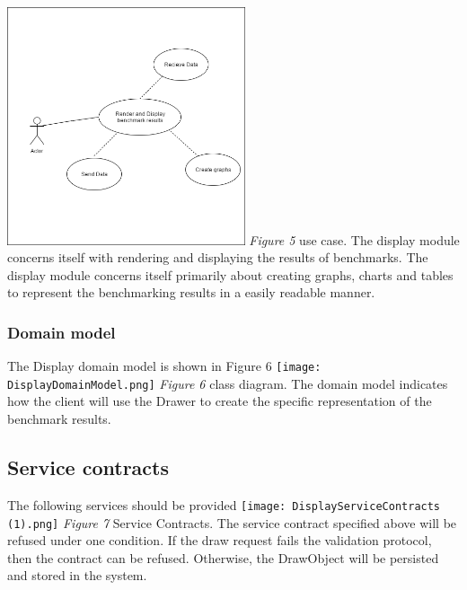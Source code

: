 \documentclass[runningheads,a4paper]{article}
\begin{document}
\includegraphics[width=7cm,height=7cm]{../Images/DisplayUseCase.png}
\newline 
\textit{Figure 5} use case.
\newline
\newline
The display module concerns itself with rendering and displaying the results of benchmarks.
The display module concerns itself primarily about creating graphs, charts and tables to represent the
benchmarking results in a easily readable manner. 
\newline
\subsubsection{\textbf{Domain model}}
The Display domain model is shown in Figure 6
\newline
\newline
\texttt{[image: DisplayDomainModel.png]}
\newline 
\textit{Figure 6} class diagram.
\newline
The domain model indicates how the client will use the Drawer to create the specific representation of the benchmark results.
\newline
\subsection{\textbf{Service contracts}}
The following services should be provided
\newline
\newline
\texttt{[image: DisplayServiceContracts (1).png]}
\newline 
\textit{Figure 7} Service Contracts.
\newline
The service contract specified above will be refused under one condition. If the draw request fails the validation protocol, 
then the contract can be refused. Otherwise, the DrawObject will be persisted and stored in the system.
\newline
\end{document}

